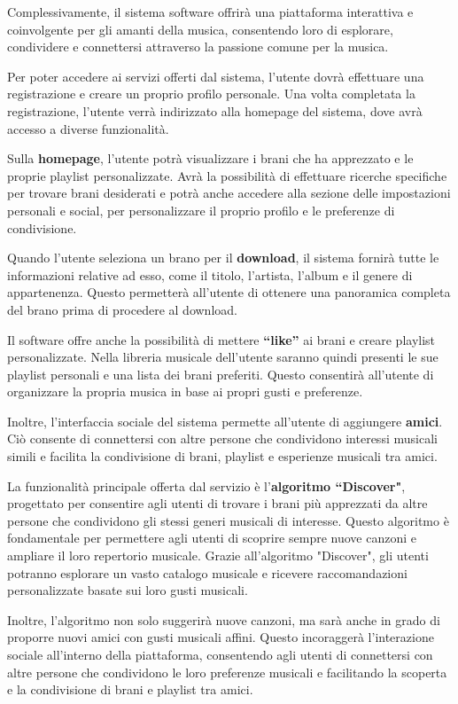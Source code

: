 Complessivamente, il sistema software offrirà una piattaforma interattiva e coinvolgente per gli amanti della musica, 
consentendo loro di esplorare, condividere e connettersi attraverso la passione comune per la musica.

Per poter accedere ai servizi offerti dal sistema, l'utente dovrà effettuare una registrazione e creare un proprio profilo personale. 
Una volta completata la registrazione, l'utente verrà indirizzato alla homepage del sistema, dove avrà accesso a diverse funzionalità.

Sulla \textbf{homepage}, l'utente potrà visualizzare i brani che ha apprezzato e le proprie playlist personalizzate. 
Avrà la possibilità di effettuare ricerche specifiche per trovare brani desiderati e potrà anche accedere alla 
sezione delle impostazioni personali e social, per personalizzare il proprio profilo e le preferenze di condivisione.

Quando l'utente seleziona un brano per il \textbf{download}, il sistema fornirà tutte le informazioni relative ad esso, 
come il titolo, l'artista, l'album e il genere di appartenenza. Questo permetterà all'utente di ottenere una panoramica 
completa del brano prima di procedere al download.

Il software offre anche la possibilità di mettere \textbf{``like''} ai brani e creare playlist personalizzate. 
Nella libreria musicale dell'utente saranno quindi presenti le sue playlist personali e una lista dei brani preferiti. 
Questo consentirà all'utente di organizzare la propria musica in base ai propri gusti e preferenze.

Inoltre, l'interfaccia sociale del sistema permette all'utente di aggiungere \textbf{amici}. 
Ciò consente di connettersi con altre persone che condividono interessi musicali simili e facilita 
la condivisione di brani, playlist e esperienze musicali tra amici.

La funzionalità principale offerta dal servizio è l'\textbf{algoritmo ``Discover"}, progettato per consentire 
agli utenti di trovare i brani più apprezzati da altre persone che condividono gli stessi generi musicali di interesse. 
Questo algoritmo è fondamentale per permettere agli utenti di scoprire sempre nuove canzoni e ampliare il 
loro repertorio musicale. Grazie all'algoritmo "Discover", gli utenti potranno esplorare un vasto catalogo musicale e 
ricevere raccomandazioni personalizzate basate sui loro gusti musicali.

Inoltre, l'algoritmo non solo suggerirà nuove canzoni, ma sarà anche in grado di proporre nuovi amici 
con gusti musicali affini. Questo incoraggerà l'interazione sociale all'interno della piattaforma, consentendo 
agli utenti di connettersi con altre persone che condividono le loro preferenze musicali e facilitando la scoperta e 
la condivisione di brani e playlist tra amici.

